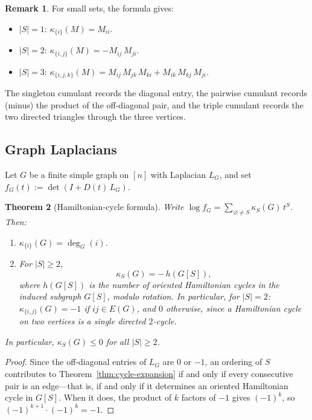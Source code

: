 \documentclass[11pt]{amsart}
\newtheorem{thm}{Theorem}[section]
\theoremstyle{definition}
\newtheorem{remark}[thm]{Remark}
\begin{document}
\begin{remark}\label{rem:small-cumulants}
For small sets, the formula gives:
\begin{itemize}
\item $|S|=1$:
$\kappa_{\{i\}}(M) = M_{ii}$.

\item $|S|=2$:
$\kappa_{\{i,j\}}(M) = -M_{ij}\, M_{ji}$.

\item $|S|=3$:
$\kappa_{\{i,j,k\}}(M) = M_{ij}\, M_{jk}\, M_{ki}
+ M_{ik}\, M_{kj}\, M_{ji}$.
\end{itemize}
The singleton cumulant records the diagonal entry, the pairwise
cumulant records (minus) the product of the off-diagonal pair,
and the triple cumulant records the two directed triangles
through the three vertices.
\end{remark}

\subsection{Graph Laplacians}

Let $G$ be a finite simple graph on $[n]$ with Laplacian $L_G$,
and set $f_G(t) := \det(I + D(t)\, L_G)$.

\begin{thm}[Hamiltonian-cycle formula]
\label{thm:hamiltonian}
Write $\log f_G = \sum_{\varnothing\neq S} \kappa_S(G)\, t^S$.
Then:
\begin{enumerate}
  \item[\textup{(i)}]
  $\kappa_{\{i\}}(G) = \deg_G(i)$.
  \item[\textup{(ii)}]
  For $|S|\ge 2$,
  \[
    \kappa_S(G) = -\,h(G[S]),
  \]
  where $h(G[S])$ is the number of oriented Hamiltonian cycles
  in the induced subgraph $G[S]$, modulo rotation.
  In particular, for $|S|=2$: $\kappa_{\{i,j\}}(G) = -1$ if
  $ij\in E(G)$, and $0$ otherwise, since a Hamiltonian cycle on
  two vertices is a single directed $2$-cycle.
\end{enumerate}
In particular, $\kappa_S(G)\le 0$ for all $|S|\ge 2$.
\end{thm}

\begin{proof}
Since the off-diagonal entries of $L_G$ are $0$ or $-1$, an ordering of $S$ contributes to Theorem~\ref{thm:cycle-expansion} if and only if every consecutive pair is an edge---that is, if and only if it determines an oriented Hamiltonian cycle in $G[S]$.  When it does, the product of $k$ factors of $-1$ gives $(-1)^k$, so $(-1)^{k+1}\cdot(-1)^k = -1$.
\end{proof}
\end{document}
